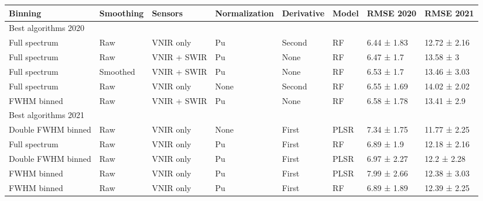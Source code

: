 \begin{longtable}{llllllll}
\toprule
Binning & Smoothing & Sensors & Normalization & Derivative & Model & RMSE 2020 & RMSE 2021 \\ 
\midrule
\multicolumn{8}{l}{Best algorithms 2020} \\ 
\midrule
Full spectrum & Raw & VNIR only & Pu & Second & RF & 6.44 ± 1.83 & 12.72 ± 2.16 \\ 
Full spectrum & Raw & VNIR + SWIR & Pu & None & RF & 6.47 ± 1.7 & 13.58 ± 3 \\ 
Full spectrum & Smoothed & VNIR + SWIR & Pu & None & RF & 6.53 ± 1.7 & 13.46 ± 3.03 \\ 
Full spectrum & Raw & VNIR only & None & Second & RF & 6.55 ± 1.69 & 14.02 ± 2.02 \\ 
FWHM binned & Raw & VNIR + SWIR & Pu & None & RF & 6.58 ± 1.78 & 13.41 ± 2.9 \\ 
\midrule
\multicolumn{8}{l}{Best algorithms 2021} \\ 
\midrule
Double FWHM binned & Raw & VNIR only & None & First & PLSR & 7.34 ± 1.75 & 11.77 ± 2.25 \\ 
Full spectrum & Raw & VNIR only & Pu & First & RF & 6.89 ± 1.9 & 12.18 ± 2.16 \\ 
Double FWHM binned & Raw & VNIR only & Pu & First & PLSR & 6.97 ± 2.27 & 12.2 ± 2.28 \\ 
FWHM binned & Raw & VNIR only & Pu & First & PLSR & 7.99 ± 2.66 & 12.38 ± 3.03 \\ 
FWHM binned & Raw & VNIR only & Pu & First & RF & 6.89 ± 1.89 & 12.39 ± 2.25 \\ 
\bottomrule
\end{longtable}

